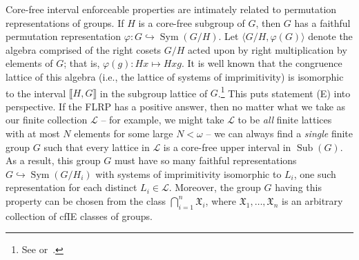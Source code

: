 \documentclass{gen-j-l}
\newcommand{\lb}{\ensuremath{\llbracket}}
\newcommand{\rb}{\ensuremath{\rrbracket}}
\newcommand{\<}{\ensuremath{\langle}}
\renewcommand{\>}{\ensuremath{\rangle}}
\theoremstyle{plain}
\theoremstyle{definition}
\theoremstyle{remark}
\numberwithin{theorem}{section}
\numberwithin{claim}{section}
\numberwithin{equation}{section}
\numberwithin{conjecture}{section}
\renewcommand{\leq}{\ensuremath{\leqslant}}
\newcommand{\Con}{\ensuremath{\operatorname{Con}}}
\newcommand{\Sub}{\ensuremath{\operatorname{Sub}}}
\newcommand{\Sym}{\ensuremath{\operatorname{Sym}}}
\newcommand{\2}{\ensuremath{\mathbf{2}}}
\newcommand{\3}{\ensuremath{\mathbf{3}}}
\newcommand{\sG}{\ensuremath{\mathfrak{X}}}
\newcommand{\sL}{\ensuremath{\mathscr{L}}}
\renewcommand{\phi}{\ensuremath{\varphi}}
\begin{document}
Core-free interval enforceable properties are intimately related to permutation
representations of groups.   
If $H$ is a core-free subgroup of $G$, then $G$ has a faithful permutation 
representation $\phi:G\hookrightarrow \Sym(G/H)$.
Let $\<G/H, \phi(G)\>$ denote the algebra comprised of the right cosets
$G/H$ acted upon by right multiplication by elements of $G$; that is,
$\phi(g): Hx \mapsto Hxg$.  It is
well known that the congruence lattice of this algebra (i.e., the lattice of
systems of imprimitivity) %
 is isomorphic to the interval $\lb H, G \rb$ in the subgroup
lattice of $G$.\footnote{See \cite[Lemma 4.20]{alvi:1987}
or~\cite[Theorem 1.5A]{Dixon:1996}.}
This puts statement (E) into perspective.
If the \acs{FLRP} has a positive answer, then no matter 
what we take as our finite collection $\sL$ -- for example, we
might take $\sL$ to be \emph{all} finite lattices with
at most $N$ elements for some large $N< \omega$ -- we can always find a \emph{single}
finite group $G$ such that every lattice in $\sL$ is a core-free upper interval in
$\Sub(G)$.
As a result, this group $G$ must have so many faithful
representations  $G\hookrightarrow \Sym(G/H_i)$ with systems of imprimitivity
isomorphic to $L_i$,
one such
representation for each distinct $L_i\in \sL$.  Moreover, the group $G$ having
this property can be chosen from the class $\bigcap\limits_{i=1}^n \sG_i$, where 
$\sG_1, \dots, \sG_n$ is an arbitrary collection of \acs{cfIE} classes of groups.

\end{document}

